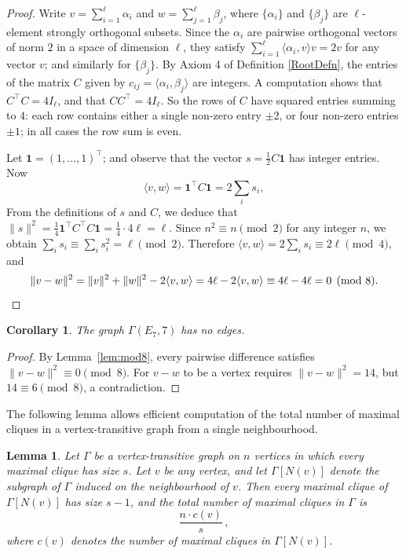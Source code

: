 \documentclass[11pt]{article}
\newtheorem{lemma}[theorem]{Lemma}
\newtheorem{corollary}[theorem]{Corollary}
\begin{document}
\begin{proof}
Write $v = \sum_{i=1}^{\ell} \alpha_i$ and $w = \sum_{j=1}^{\ell} \beta_j$, where $\{\alpha_i\}$ and $\{\beta_j\}$ are $\ell$-element strongly orthogonal subsets. Since the $\alpha_i$ are pairwise orthogonal vectors of norm $2$ in a space of dimension $\ell$, they satisfy $\sum_{i=1}^{\ell} \langle \alpha_{i}, v\rangle v = 2v$ for any vector $v$; and similarly for $\{\beta_j\}$. By Axiom 4 of Definition \ref{RootDefn}, the entries of the matrix  $C$ given by $c_{ij} = \langle \alpha_i, \beta_j \rangle$ are integers. A computation shows that $C^\top C = 4 I_\ell$, and that $CC^\top = 4I_\ell$. 
So the rows of $C$ have squared entries summing to $4$: each row contains either a single non-zero entry $\pm 2$, or four non-zero entries $\pm 1$; in all cases the row sum is even.

Let $\mathbf{1} = (1, \ldots, 1)^\top$; and observe that the vector $s = \frac{1}{2}C\mathbf{1}$ has integer entries. Now
\[
\langle v, w \rangle = \mathbf{1}^\top C \mathbf{1} = 2 \sum_{i} s_{i},
\]
From the definitions of $s$ and $C$, we deduce that $\|s\|^2 = \tfrac{1}{4}\mathbf{1}^\top C^\top C \mathbf{1} = \tfrac{1}{4} \cdot 4\ell = \ell$. 
Since $n^2 \equiv n \pmod{2}$ for any integer $n$, we obtain $\sum_i s_i \equiv \sum_i s_i^2 = \ell \pmod{2}$. Therefore $\langle v, w \rangle = 2\sum_i s_i \equiv 2\ell \pmod{4}$, and
\[
\|v - w\|^2 = \|v\|^2 + \|w\|^2 - 2\langle v, w \rangle = 4\ell - 2\langle v, w \rangle \equiv 4\ell - 4\ell = 0 \pmod{8}. \qedhere
\]
\end{proof}

\begin{corollary}\label{cor:e7edgeless}
The graph $\Gamma(E_7, 7)$ has no edges.
\end{corollary}

\begin{proof}
By Lemma~\ref{lem:mod8}, every pairwise difference satisfies $\|v - w\|^2 \equiv 0 \pmod 8$. For $v - w$ to be a vertex requires $\|v - w\|^2 = 14$, but $14 \equiv 6 \pmod 8$, a contradiction.
\end{proof}

The following lemma allows efficient computation of the total number of maximal cliques in a vertex-transitive graph from a single neighbourhood.

\begin{lemma}\label{lem:nbr-count}
Let $\Gamma$ be a vertex-transitive graph on $n$ vertices in which every maximal clique has size $s$. Let $v$ be any vertex, and let $\Gamma[N(v)]$ denote the subgraph of $\Gamma$ induced on the neighbourhood of $v$. Then every maximal clique of $\Gamma[N(v)]$ has size $s-1$, and the total number of maximal cliques in $\Gamma$ is
\[
\frac{n \cdot c(v)}{s}\,,
\]
where $c(v)$ denotes the number of maximal cliques in $\Gamma[N(v)]$.
\end{lemma}
\end{document}
